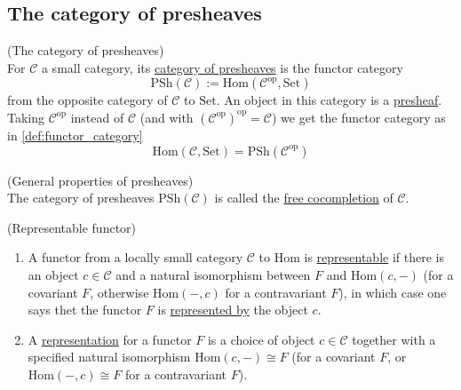 
\subsection{The category of presheaves}

\begin{definition}{(The category of presheaves)}\\
For $\mathcal{C}$ a small category, its \ul{category of presheaves} is the functor category
\[ \mathrm{PSh}(\mathcal{C}) := \mathrm{Hom}(\mathcal{C}^{\text{op}}, \mathrm{Set}) \]
from the opposite category of $\mathcal{C}$ to $\mathrm{Set}$.
An object in this category is a \ul{presheaf}.\\
\noindent Taking $\mathcal{C}^{\text{op}}$ instead of $\mathcal{C}$ (and with $(\mathcal{C}^{\text{op}})^{\text{op}} = \mathcal{C}$) we get the
functor category as in \ref{def:functor_category}
\[
\mathrm{Hom}(\mathcal{C}, \mathrm{Set}) = \mathrm{PSh}(\mathcal{C}^{\text{op}}) \]
\end{definition}

\begin{remark}{(General properties of presheaves)}\\
The category of presheaves $\mathrm{PSh}(\mathcal{C})$ is called the \ul{free cocompletion} of $\mathcal{C}$.
\end{remark}

\begin{definition}{(Representable functor)}\label{def:repres_functor}
\begin{enumerate}
\renewcommand{\labelenumi}{(\theenumi)}
\item A functor from a locally small category $\mathcal{C}$ to $\mathrm{Hom}$ is \ul{representable} if there is an object $c \in \mathcal{C}$ and a
natural isomorphism between $F$ and $\mathrm{Hom}(c,-)$ (for a covariant $F$, otherwise $\mathrm{Hom}(-,c)$ for a contravariant $F$), in which case
one says thet the functor $F$ is \ul{represented by} the object $c$.
\item A \ul{representation} for a functor $F$ is a choice of object $c \in \mathcal{C}$ together with a specified natural isomorphism
$\mathrm{Hom}(c,-) \cong F$ (for a covariant $F$, or $\mathrm{Hom}(-,c) \cong F$ for a contravariant $F$).
\end{enumerate}
\end{definition}

